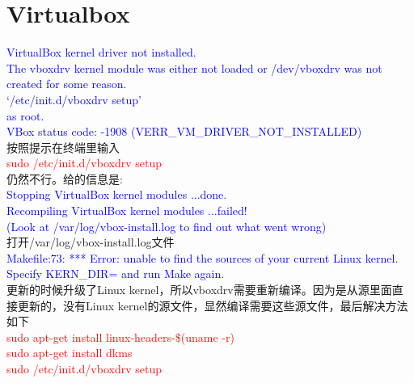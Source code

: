 \documentclass[10pt, oneside, a4paper]{article}      %
\begin{document}
\section{Virtualbox}
\textcolor{blue}{\textrm{VirtualBox kernel driver not installed.\\
The vboxdrv kernel module was either not loaded or /dev/vboxdrv was not created for some reason.\\
‘/etc/init.d/vboxdrv setup’\\
as root.\\
VBox status code: -1908 (VERR\_VM\_DRIVER\_NOT\_INSTALLED)}} \\

按照提示在终端里输入\\
\textcolor{red}{\textrm{sudo /etc/init.d/vboxdrv setup}}\\
仍然不行。给的信息是:\\

\textcolor{blue}{\textrm{Stopping VirtualBox kernel modules ...done.\\
Recompiling VirtualBox kernel modules ...failed!\\
  (Look at /var/log/vbox-install.log to find out what went wrong)}} \\

打开/var/log/vbox-install.log文件\\

\textcolor{blue}{\textrm{Makefile:73: *** Error: unable to find the sources of your current Linux kernel. Specify KERN\_DIR= and run Make again.}}\\

更新的时候升级了\textrm{Linux kernel}，所以\textrm{vboxdrv}需要重新编译。因为是从源里面直接更新的，没有Linux kernel的源文件，显然编译需要这些源文件，最后解决方法如下\\

\textcolor{red}{\textrm{sudo apt-get install linux-headers-\$(uname -r)\\
	\textrm{sudo apt-get install dkms}\\
	\textrm{sudo /etc/init.d/vboxdrv setup}}}
\end{document}
